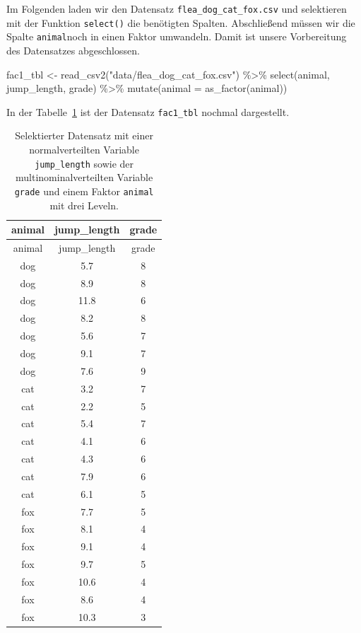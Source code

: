 \documentclass[
  letterpaper,
  DIV=11,
  oneside]{scrreport}
\newenvironment{Shaded}{\begin{snugshade}}{\end{snugshade}}
\newcommand{\AttributeTok}[1]{\textcolor[rgb]{0.40,0.45,0.13}{#1}}
\newcommand{\FunctionTok}[1]{\textcolor[rgb]{0.28,0.35,0.67}{#1}}
\newcommand{\NormalTok}[1]{\textcolor[rgb]{0.00,0.23,0.31}{#1}}
\newcommand{\OtherTok}[1]{\textcolor[rgb]{0.00,0.23,0.31}{#1}}
\newcommand{\SpecialCharTok}[1]{\textcolor[rgb]{0.37,0.37,0.37}{#1}}
\newcommand{\StringTok}[1]{\textcolor[rgb]{0.13,0.47,0.30}{#1}}
\begin{document}
Im Folgenden laden wir den Datensatz \texttt{flea\_dog\_cat\_fox.csv}
und selektieren mit der Funktion \texttt{select()} die benötigten
Spalten. Abschließend müssen wir die Spalte \texttt{animal}noch in einen
Faktor umwandeln. Damit ist unsere Vorbereitung des Datensatzes
abgeschlossen.

\begin{Shaded}
\begin{Highlighting}[]
\NormalTok{fac1\_tbl }\OtherTok{\textless{}{-}} \FunctionTok{read\_csv2}\NormalTok{(}\StringTok{"data/flea\_dog\_cat\_fox.csv"}\NormalTok{) }\SpecialCharTok{\%\textgreater{}\%}
  \FunctionTok{select}\NormalTok{(animal, jump\_length, grade) }\SpecialCharTok{\%\textgreater{}\%} 
  \FunctionTok{mutate}\NormalTok{(}\AttributeTok{animal =} \FunctionTok{as\_factor}\NormalTok{(animal))}
\end{Highlighting}
\end{Shaded}

In der Tabelle~\ref{tbl-data-posthoc-1} ist der Datensatz
\texttt{fac1\_tbl} nochmal dargestellt.

\hypertarget{tbl-data-posthoc-1}{}
\begin{longtable}[]{@{}ccc@{}}
\caption{\label{tbl-data-posthoc-1}Selektierter Datensatz mit einer
normalverteilten Variable \texttt{jump\_length} sowie der
multinominalverteilten Variable \texttt{grade} und einem Faktor
\texttt{animal} mit drei Leveln.}\tabularnewline
\toprule()
animal & jump\_length & grade \\
\midrule()
\endfirsthead
\toprule()
animal & jump\_length & grade \\
\midrule()
\endhead
dog & 5.7 & 8 \\
dog & 8.9 & 8 \\
dog & 11.8 & 6 \\
dog & 8.2 & 8 \\
dog & 5.6 & 7 \\
dog & 9.1 & 7 \\
dog & 7.6 & 9 \\
cat & 3.2 & 7 \\
cat & 2.2 & 5 \\
cat & 5.4 & 7 \\
cat & 4.1 & 6 \\
cat & 4.3 & 6 \\
cat & 7.9 & 6 \\
cat & 6.1 & 5 \\
fox & 7.7 & 5 \\
fox & 8.1 & 4 \\
fox & 9.1 & 4 \\
fox & 9.7 & 5 \\
fox & 10.6 & 4 \\
fox & 8.6 & 4 \\
fox & 10.3 & 3 \\
\bottomrule()
\end{longtable}
\end{document}
